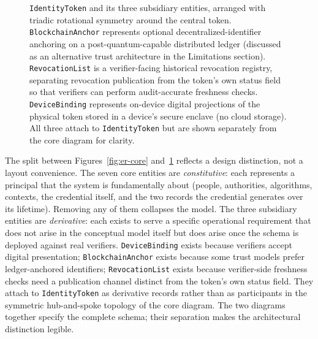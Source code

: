 \documentclass[11pt,letterpaper]{article}
\newcommand{\entity}[1]{\texttt{\color{navydark}#1}}
\begin{document}
\begin{figure}[H]

\caption{\entity{IdentityToken} and its three subsidiary entities, arranged with triadic rotational symmetry around the central token. \entity{BlockchainAnchor} represents optional decentralized-identifier anchoring on a post-quantum-capable distributed ledger (discussed as an alternative trust architecture in the Limitations section). \entity{RevocationList} is a verifier-facing historical revocation registry, separating revocation publication from the token's own status field so that verifiers can perform audit-accurate freshness checks. \entity{DeviceBinding} represents on-device digital projections of the physical token stored in a device's secure enclave (no cloud storage). All three attach to \entity{IdentityToken} but are shown separately from the core diagram for clarity.}
\label{fig:er-subsidiary}
\end{figure}

The split between Figures~\ref{fig:er-core} and~\ref{fig:er-subsidiary} reflects a design distinction, not a layout convenience. The seven core entities are \textit{constitutive}: each represents a principal that the system is fundamentally about (people, authorities, algorithms, contexts, the credential itself, and the two records the credential generates over its lifetime). Removing any of them collapses the model. The three subsidiary entities are \textit{derivative}: each exists to serve a specific operational requirement that does not arise in the conceptual model itself but does arise once the schema is deployed against real verifiers. \entity{DeviceBinding} exists because verifiers accept digital presentation; \entity{BlockchainAnchor} exists because some trust models prefer ledger-anchored identifiers; \entity{RevocationList} exists because verifier-side freshness checks need a publication channel distinct from the token's own status field. They attach to \entity{IdentityToken} as derivative records rather than as participants in the symmetric hub-and-spoke topology of the core diagram. The two diagrams together specify the complete schema; their separation makes the architectural distinction legible.
\end{document}
